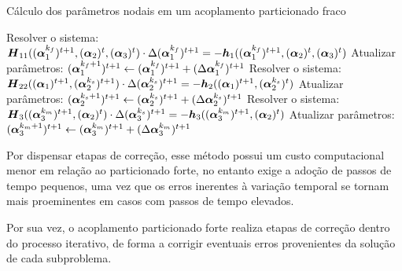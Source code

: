 \begin{algorithm}[h!]
    \caption{Cálculo dos parâmetros nodais em um acoplamento particionado fraco}
    \label{alg:PartFraco}
    Resolver o sistema: $\boldsymbol{H}_{11}((\boldsymbol{\alpha}_1^{k_f})^{t+1},(\boldsymbol{\alpha}_2)^t,(\boldsymbol{\alpha}_3)^t)\cdot\Delta(\boldsymbol{\alpha}_1^{k_f})^{t+1}=-\boldsymbol{h}_1((\boldsymbol{\alpha}_1^{k_f})^{t+1},(\boldsymbol{\alpha}_2)^t,(\boldsymbol{\alpha}_3)^t)$\;
    Atualizar parâmetros: $(\boldsymbol{\alpha}_1^{k_f+1})^{t+1}\gets(\boldsymbol{\alpha}_1^{k_f})^{t+1}+(\Delta\boldsymbol{\alpha}_1^{k_f})^{t+1}$\;
    Resolver o sistema: $\boldsymbol{H}_{22}((\boldsymbol{\alpha}_1)^{t+1},(\boldsymbol{\alpha}_2^{k_s})^{t+1})\cdot\Delta(\boldsymbol{\alpha}_2^{k_s})^{t+1}=-\boldsymbol{h}_2((\boldsymbol{\alpha}_1)^{t+1},(\boldsymbol{\alpha}_2^{k_s})^t)$\;
    Atualizar parâmetros: $(\boldsymbol{\alpha}_2^{k_s+1})^{t+1}\gets(\boldsymbol{\alpha}_2^{k_s})^{t+1}+(\Delta\boldsymbol{\alpha}_2^{k_s})^{t+1}$\;
    Resolver o sistema: $\boldsymbol{H}_{3}((\boldsymbol{\alpha}_3^{k_m})^{t+1},(\boldsymbol{\alpha}_2)^t)\cdot\Delta(\boldsymbol{\alpha}_3^{k_s})^{t+1}=-\boldsymbol{h}_3((\boldsymbol{\alpha}_3^{k_m})^{t+1},(\boldsymbol{\alpha}_2)^t)$\;
    Atualizar parâmetros: $(\boldsymbol{\alpha}_3^{k_m+1})^{t+1}\gets(\boldsymbol{\alpha}_3^{k_m})^{t+1}+(\Delta\boldsymbol{\alpha}_3^{k_m})^{t+1}$\;
\end{algorithm}

Por dispensar etapas de correção, esse método possui um custo computacional menor em relação ao particionado forte, no entanto exige a adoção de passos de tempo pequenos, uma vez que os erros inerentes à variação temporal se tornam mais proeminentes em casos com passos de tempo elevados.

Por sua vez, o acoplamento particionado forte realiza etapas de correção dentro do processo iterativo, de forma a corrigir eventuais erros provenientes da solução de cada subproblema.